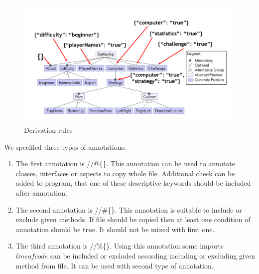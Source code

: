 \documentclass[11pt,slovak,a4paper,twoside]{article}
\begin{document}
\begin{figure}[H]  %
					\begin{center}
									\includegraphics[width=\linewidth]{fig/derivationRules.png}
									\caption{Derivation rules}
									\label{derivationRules}
					\end{center}
\end{figure}


We specified three types of annotations:

\begin{enumerate}
	\item The first annotation is //@\{\}. This annotation can be used to annotate classes, interfaces or aspects to copy whole file. Additional check can be added to program, that one of these descriptive keywords should be included after annotation.

	\item The second annotation is //\#\{\}. This annotation is suitable to include or exclude given methods. If file should be copied then at least one condition of annotation should be true. It should not be mixed with first one. 

	\item The third annotation is //\%\{\}. Using this annotation some imports \(line of code\) can be included or excluded according including or excluding given method from file. It can be used with second type of annotation. 
\end{enumerate}
\end{document}
